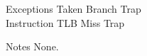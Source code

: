 \begin{iPageDescEntry}{Exceptions}{
  Taken Branch Trap\\
  Instruction TLB Miss Trap
}
\end{iPageDescEntry}

\begin{iPageDescEntry}{Notes}{
  None.
}
\end{iPageDescEntry}
